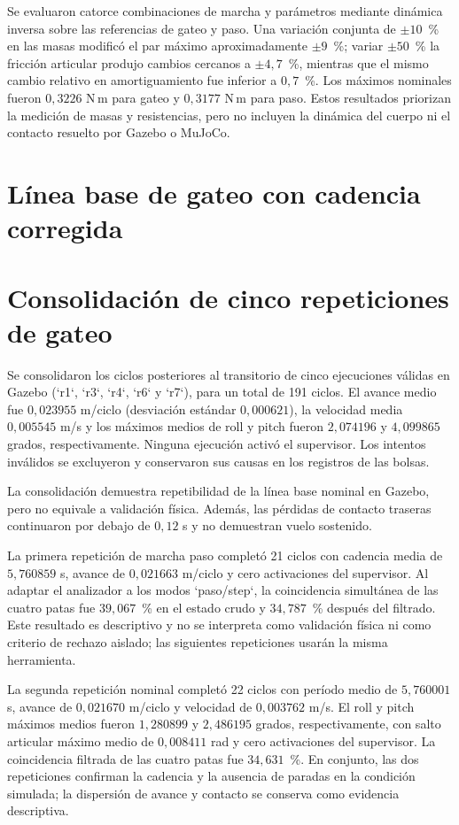 Se evaluaron catorce combinaciones de marcha y parámetros mediante dinámica
inversa sobre las referencias de gateo y paso. Una variación conjunta de
$\pm 10$~\% en las masas modificó el par máximo aproximadamente $\pm 9$~\%;
variar $\pm 50$~\% la fricción articular produjo cambios cercanos a
$\pm 4{,}7$~\%, mientras que el mismo cambio relativo en amortiguamiento fue
inferior a $0{,}7$~\%. Los máximos nominales fueron $0{,}3226$ N\,m para gateo
y $0{,}3177$ N\,m para paso. Estos resultados priorizan la medición de masas y
resistencias, pero no incluyen la dinámica del cuerpo ni el contacto resuelto
por Gazebo o MuJoCo.

\section{Línea base de gateo con cadencia corregida}

\section{Consolidación de cinco repeticiones de gateo}

Se consolidaron los ciclos posteriores al transitorio de cinco ejecuciones
válidas en Gazebo (`r1`, `r3`, `r4`, `r6` y `r7`), para un total de 191 ciclos.
El avance medio fue $0{,}023955$ m/ciclo (desviación estándar $0{,}000621$),
la velocidad media $0{,}005545$ m/s y los máximos medios de roll y pitch fueron
$2{,}074196$ y $4{,}099865$ grados, respectivamente. Ninguna ejecución activó
el supervisor. Los intentos inválidos se excluyeron y conservaron sus causas
en los registros de las bolsas.

La consolidación demuestra repetibilidad de la línea base nominal en Gazebo,
pero no equivale a validación física. Además, las pérdidas de contacto traseras
continuaron por debajo de $0{,}12$ s y no demuestran vuelo sostenido.

La primera repetición de marcha paso completó 21 ciclos con cadencia media de
$5{,}760859$ s, avance de $0{,}021663$ m/ciclo y cero activaciones del
supervisor. Al adaptar el analizador a los modos `paso/step`, la coincidencia
simultánea de las cuatro patas fue $39{,}067$~\% en el estado crudo y
$34{,}787$~\% después del filtrado. Este resultado es descriptivo y no se
interpreta como validación física ni como criterio de rechazo aislado; las
siguientes repeticiones usarán la misma herramienta.

La segunda repetición nominal completó 22 ciclos con período medio de
$5{,}760001$ s, avance de $0{,}021670$ m/ciclo y velocidad de
$0{,}003762$ m/s. El roll y pitch máximos medios fueron $1{,}280899$ y
$2{,}486195$ grados, respectivamente, con salto articular máximo medio de
$0{,}008411$ rad y cero activaciones del supervisor. La coincidencia filtrada
de las cuatro patas fue $34{,}631$~\%. En conjunto, las dos repeticiones
confirman la cadencia y la ausencia de paradas en la condición simulada; la
dispersión de avance y contacto se conserva como evidencia descriptiva.


